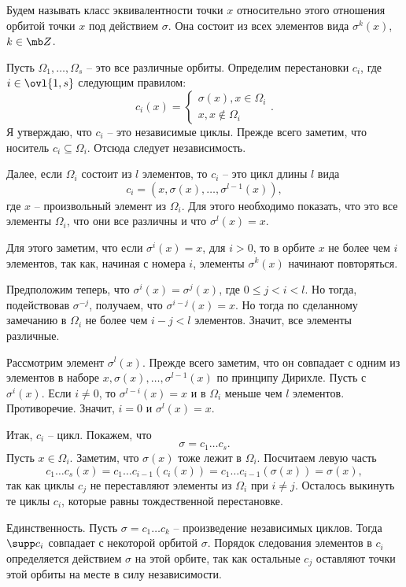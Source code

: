 Будем называть класс эквивалентности точки $x$ относительно этого отношения орбитой точки $x$ под действием $\sigma$. Она состоит из всех элементов вида $\sigma^k(x)$, $k \in \mb Z$.

Пусть $\Omega_1,\dots,\Omega_s$ -- это все различные орбиты. Определим перестановки $c_i$, где $i\in\ovl{1,s}$ следующим правилом:
$$c_i(x)=\begin{cases} \sigma(x), x\in \Omega_i\\
x, x\notin \Omega_i
\end{cases}.$$
Я утверждаю, что $c_i$ -- это независимые циклы. Прежде всего заметим, что носитель $c_i \subseteq \Omega_i$. Отсюда следует независимость.

Далее, если $\Omega_i$ состоит из $l$ элементов, то $c_i$ -- это цикл длины $l$ вида 
$$c_i=(x,\sigma(x),\dots,\sigma^{l-1}(x)), $$ где $x$ -- произвольный элемент из $\Omega_i$. Для этого необходимо показать, что это все элементы $\Omega_i$, что они все различны и что $\sigma^l(x)=x$.

Для этого заметим, что если $\sigma^i(x)=x$, для $i>0$, то в орбите $x$ не более чем $i$ элементов, так как, начиная с номера $i$, элементы $\sigma^k(x)$ начинают повторяться.

Предположим теперь, что $\sigma^i(x)=\sigma^j(x)$, где $0\leq j<i<l$. Но тогда, подействовав  $\sigma^{-j}$, получаем, что $\sigma^{i-j}(x)=x$. Но тогда по сделанному замечанию в $\Omega_i$ не более чем $i-j <l$ элементов. Значит, все элементы различные. 

Рассмотрим элемент $\sigma^l(x)$. Прежде всего заметим, что он совпадает с одним из элементов в наборе $x, \sigma(x),\dots,\sigma^{l-1}(x)$ по принципу Дирихле. Пусть с $\sigma^{i}(x)$. Если $i\neq 0$, то $\sigma^{l-i}(x)=x$ и в $\Omega_i$ меньше чем $l$ элементов. Противоречие. Значит, $i=0$ и $\sigma^l(x)=x$.

Итак, $c_i$ -- цикл. Покажем, что 
$$\sigma=c_1\dots c_s.$$
Пусть $x\in \Omega_i$. Заметим, что $\sigma(x)$ тоже лежит в $\Omega_i$. Посчитаем левую часть
$$c_1\dots c_s(x)=c_1\dots c_{i-1} (c_i(x))=c_1\dots c_{i-1} (\sigma(x))=\sigma(x),$$
так как циклы $c_j$ не переставляют элементы из $\Omega_i$ при $i\neq j$. Осталось выкинуть те циклы $c_i$, которые равны тождественной перестановке.

Единственность. Пусть $\sigma= c_1\dots c_k$ -- произведение независимых циклов. Тогда $\supp c_i$ совпадает с некоторой орбитой $\sigma$. Порядок следования элементов в $c_i$ определяется действием $\sigma$ на этой орбите, так как остальные $c_j$ оставляют точки этой орбиты на месте в силу независимости. 
\endproof




